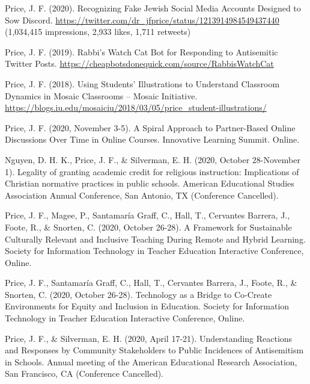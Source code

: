 \documentclass[11pt,article,oneside]{memoir}
\begin{document}
\ind Price, J. F. (2020). Recognizing Fake Jewish Social Media Accounts Designed to Sow Discord. \href{https://twitter.com/dr\_jfprice/status/1213914984549437440}{https://twitter.com/dr\_jfprice/status/1213914984549437440} (1,034,415 impressions, 2,933 likes, 1,711 retweets)

\ind Price, J. F. (2019). Rabbi's Watch Cat Bot for Responding to Antisemitic Twitter Posts. \href{https://cheapbotsdonequick.com/source/RabbisWatchCat}{https://cheapbotsdonequick.com/source/RabbisWatchCat}

\ind Price, J. F. (2018). Using Students’ Illustrations to Understand Classroom Dynamics in Mosaic Classrooms – Mosaic Initiative. \href{https://blogs.iu.edu/mosaiciu/2018/03/05/price\_student-illustrations/}{https://blogs.iu.edu/\newline mosaiciu/2018/03/05/price\_student-illustrations/}


\newpage



\ind Price, J. F. (2020, November 3-5). A Spiral Approach to Partner-Based Online Discussions Over Time in Online Courses. Innovative Learning Summit. Online.

\ind Nguyen, D. H. K., Price, J. F., \& Silverman, E. H. (2020, October 28-November 1). Legality of granting academic credit for religious instruction: Implications of Christian normative practices in public schools. American Educational Studies Association Annual Conference, San Antonio, TX (Conference Cancelled).

\ind Price, J. F., Magee, P., Santamaría Graff, C., Hall, T., Cervantes Barrera, J., Foote, R., \& Snorten, C. (2020, October 26-28). A Framework for Sustainable Culturally Relevant and Inclusive Teaching During Remote and Hybrid Learning. Society for Information Technology in Teacher Education Interactive Conference, Online.

\ind Price, J. F., Santamaría Graff, C., Hall, T., Cervantes Barrera, J., Foote, R., \& Snorten, C. (2020, October 26-28). Technology as a Bridge to Co-Create Environments for Equity and Inclusion in Education. Society for Information Technology in Teacher Education Interactive Conference, Online.

\ind Price, J. F., \& Silverman, E. H. (2020, April 17-21). Understanding Reactions and Responses by Community Stakeholders to Public Incidences of Antisemitism in Schools. Annual meeting of the American Educational Research Association, San Francisco, CA (Conference Cancelled).
\end{document}
